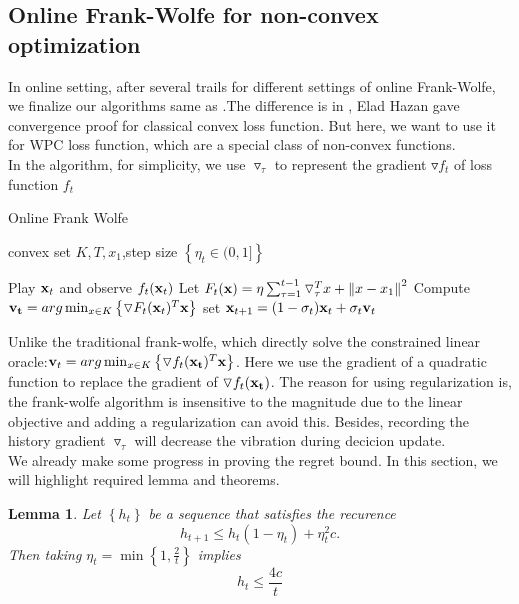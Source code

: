 \documentclass[12pt]{article}
\newtheorem{lemma}{Lemma}
\begin{document}
\subsection{Online Frank-Wolfe for non-convex optimization}
In online setting, after several trails for different settings of online Frank-Wolfe, we finalize our algorithms same as \cite{hazan2016introduction}.The difference is 
in \cite{hazan2016introduction}, Elad Hazan gave convergence proof for classical convex loss function. But here, we want to use it for WPC loss function, which are a special class of non-convex functions.\\
In the algorithm, for simplicity, we use $\triangledown_{\tau}$ to represent the gradient $\triangledown f_t$ of loss function $f_t$
\begin{algorithm}[H]
\caption{Online Frank Wolfe}\label{ofw}
\begin{algorithmic}
\Require convex set $K,T,x_1$,step size $\left \{ \eta_t \in (0,1] \right \}$


\State Play $\bold{x}_t$ and observe $f_t(\bold{x}_t)$
\State Let $F_t(\bold{x}) = \eta \sum_{\tau=1}^{t-1} \triangledown_{\tau}^Tx + \left \| x-x_1 \right \|^2$
\State Compute $\bold{v_t} = arg \min_{x\in K} \left \{ \triangledown F_t(\bold{x}_t)^T \bold{x} \right \}$
\State set $\bold{x}_{t+1} = (1-\sigma_t)\bold{x}_t+\sigma_t \bold{v}_t$
\EndFor
\end{algorithmic}
\end{algorithm}
Unlike the traditional frank-wolfe, which directly solve the constrained linear oracle:$\bold{v}_t = arg \min_{x\in K} \left \{ \triangledown f_t(\bold{x_t})^T \bold{x} \right \}$. Here we use the gradient of a quadratic function to replace the gradient of $\triangledown f_t(\bold{x_t})$. The reason for using regularization is, the frank-wolfe algorithm is insensitive to the magnitude due to the linear objective and adding a regularization can avoid this. Besides, recording the history gradient $\triangledown_{\tau}$ will decrease the vibration during decicion update.\\
We already make some progress in proving the regret bound. In this section, we will highlight required lemma and theorems.\\
\begin{lemma}
Let $\left\{h_t\right\}$ be a sequence that satisfies the recurence
$$
h_{t+1} \leq h_t\left(1-\eta_t\right)+\eta_t^2 c .
$$
Then taking $\eta_t=\min \left\{1, \frac{2}{t}\right\}$ implies
$$
h_t \leq \frac{4 c}{t}
$$
\end{lemma}
\end{document}
